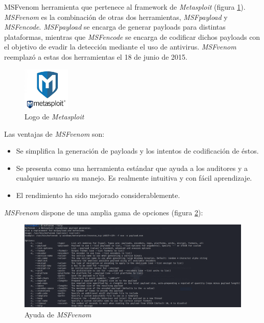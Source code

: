 MSFvenom\cite{msfvenom} herramienta que pertenece al framework de \textit{Metasploit}\cite{metasploit} (figura \ref{fig:logo-metasploit}). \textit{MSFvenom} es la combinación de otras dos herramientas, \textit{MSFpayload} y \textit{MSFencode}. \textit{MSFpayload} se encarga de generar payloads para distintas plataformas, mientras que \textit{MSFencode} se encarga de codificar dichos payloads con el objetivo de evadir la detección mediante el uso de antivirus. \textit{MSFvenom} reemplazó a estas dos herramientas el 18 de junio de 2015.\\

\begin{figure}[h]
    \centering
    \includegraphics[width=0.20\textwidth]{images/sections/tools/metasploit-logo.png}
    \caption{Logo de \textit{Metasploit}}
    \label{fig:logo-metasploit}
\end{figure}

Las ventajas de \textit{MSFvenom} son:
\begin{itemize}
    \item Se simplifica la generación de payloads y los intentos de codificación de éstos.
    \item Se presenta como una herramienta estándar que ayuda a los auditores y a cualquier usuario su manejo. Es realmente intuitiva y con fácil aprendizaje.
    \item El rendimiento ha sido mejorado considerablemente.
\end{itemize}

\textit{MSFvenom} dispone de una amplia gama de opciones (figura \ref{fig:ayuda-msfvenom}):

\begin{figure}[h]
    \centering
    \includegraphics[width=1.0\textwidth]{images/sections/tools/msfvenom-help.png}
    \caption{Ayuda de \textit{MSFvenom}}
    \label{fig:ayuda-msfvenom}
\end{figure}